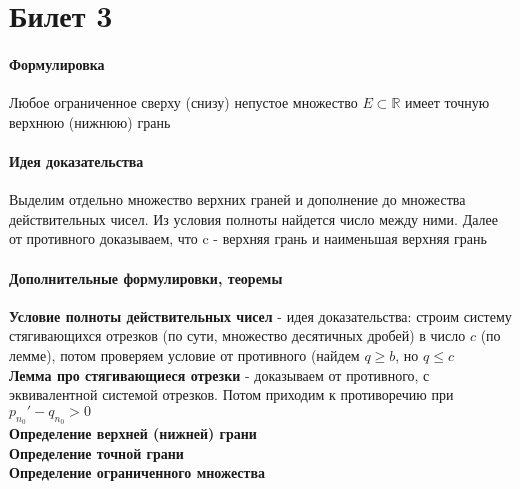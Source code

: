 \documentclass[a4paper,10pt]{article}
\begin{document}
	\section{Билет 3}
	\begin{center} 
		\item \paragraph{Формулировка} 
	\end{center}
		Любое ограниченное сверху (снизу) непустое множество $E \subset \mathbb{R}$ имеет точную верхнюю (нижнюю) грань
	\begin{center} 
		\item \paragraph{Идея доказательства} 
	\end{center}
		Выделим отдельно множество верхних граней и дополнение до множества действительных чисел. Из условия полноты найдется число между ними. Далее от противного доказываем, что c - верхняя грань и наименьшая верхняя грань \\
	\begin{center} 
		\item \paragraph{Дополнительные формулировки, теоремы} 
	\end{center}
	\textbf{Условие полноты действительных чисел} - идея доказательства: строим систему стягивающихся отрезков (по сути, множество десятичных дробей) в число $c$ (по лемме), потом проверяем условие от противного (найдем $ q\geq b$, но $q \le c$ \\
	\textbf{Лемма про стягивающиеся отрезки} - доказываем от противного, с эквивалентной системой отрезков. Потом приходим к противоречию при $p_{n_{0}}' - q_{n_{0}} > 0$ \\ 
	\textbf{Определение верхней (нижней) грани} \\
	\textbf{Определение точной грани} \\
	\textbf{Определение ограниченного множества} \\
\end{document}
